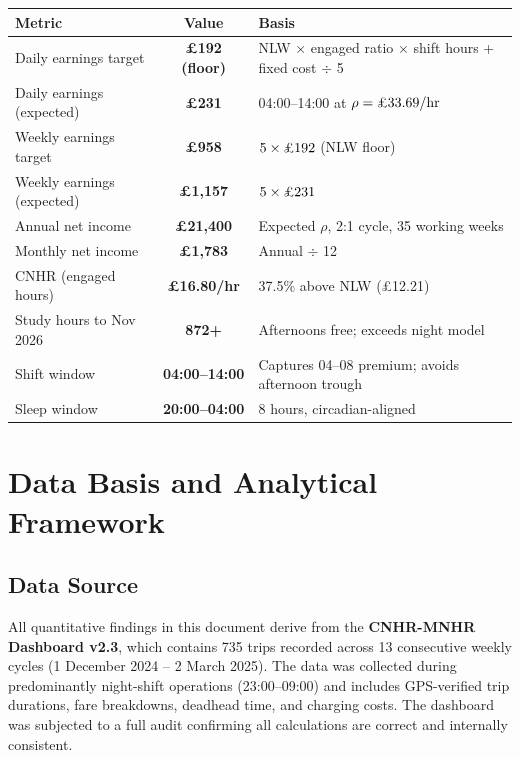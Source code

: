\documentclass[a4paper,11pt]{article}
\begin{document}
\begin{tabularx}{\textwidth}{X C l}
\toprule
\textbf{Metric} & \textbf{Value} & \textbf{Basis} \\
\midrule
Daily earnings target & \textbf{\pounds192 (floor)} & NLW $\times$ engaged ratio $\times$ shift hours + fixed cost $\div$ 5 \\
Daily earnings (expected) & \textbf{\pounds231} & 04:00--14:00 at $\rho = \text{\pounds33.69/hr}$ \\
Weekly earnings target & \textbf{\pounds958} & $5 \times \text{\pounds192}$ (NLW floor) \\
Weekly earnings (expected) & \textbf{\pounds1,157} & $5 \times \text{\pounds231}$ \\
Annual net income & \textbf{\pounds21,400} & Expected $\rho$, 2:1 cycle, 35 working weeks \\
Monthly net income & \textbf{\pounds1,783} & Annual $\div$ 12 \\
CNHR (engaged hours) & \textbf{\pounds16.80/hr} & 37.5\% above NLW (\pounds12.21) \\
Study hours to Nov 2026 & \textbf{872+} & Afternoons free; exceeds night model \\
Shift window & \textbf{04:00--14:00} & Captures 04--08 premium; avoids afternoon trough \\
Sleep window & \textbf{20:00--04:00} & 8 hours, circadian-aligned \\
\bottomrule
\end{tabularx}

\newpage

\section{Data Basis and Analytical Framework}

\subsection{Data Source}

All quantitative findings in this document derive from the \textbf{CNHR-MNHR Dashboard v2.3}, which contains 735 trips recorded across 13 consecutive weekly cycles (1 December 2024 -- 2 March 2025). The data was collected during predominantly night-shift operations (23:00--09:00) and includes GPS-verified trip durations, fare breakdowns, deadhead time, and charging costs. The dashboard was subjected to a full audit confirming all calculations are correct and internally consistent.
\end{document}
